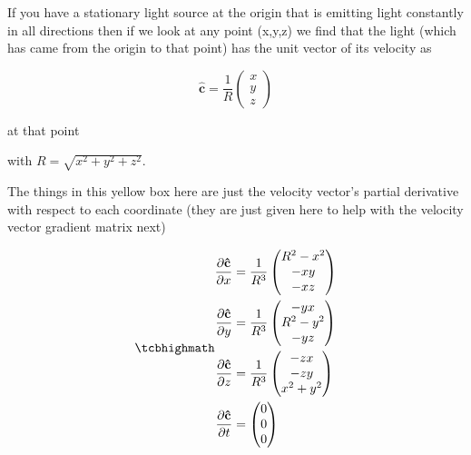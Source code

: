 If you have a stationary light source at the origin that is emitting light constantly in all directions then if we look at any point (x,y,z) we find that the light (which has came from the origin to that point) has the unit vector of its velocity as

\begin{equation}
	\mathbf{\hat{c}} = \frac{1}{R}
	\begin{pmatrix}
		x \\
		y \\
		z
	\end{pmatrix}
\end{equation}

at that point


with $R=\sqrt{x^2 + y^2 + z^2}$.

The things in this yellow box here are just the velocity vector's partial derivative with respect to each coordinate (they are just given here to help with the velocity vector  gradient matrix next)

\begin{equation}
	\mhl
	{
	\begin{aligned}
		\frac{\partial \mathbf{\hat{c}}}{\partial x} &=
	\frac{1}{ R^3 }
	\begin{pmatrix}
		R^2 - x^2 \\
		- x y \\
		- x z
	\end{pmatrix} \\
	\frac{\partial \mathbf{\hat{c}}}{\partial y} &=
	\frac{1}{ R^3 }
	\begin{pmatrix}
		- y x \\
		R^2 - y^2  \\
		- y z
	\end{pmatrix} \\
		\frac{\partial \mathbf{\hat{c}}}{\partial z} &= \frac{1}{ R^3}
		\begin{pmatrix}
			 -  z  x \\
			 -  z   y \\
			 x^2 + y^2
		\end{pmatrix}\\
		\frac{\partial \mathbf{\hat{c}}}{\partial t} &=
	\begin{pmatrix}
		 0 \\
		 0 \\
		 0
	\end{pmatrix}
	\end{aligned}
	}
\end{equation}


